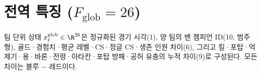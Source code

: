 
\section{전역 특징 ($F_{\mathrm{glob}} = 26$)}
\label{sec:feat-global}

팀 단위 상태 $x^{\mathrm{glob}}_\ell \in \R^{26}$은 정규화된 경기 시각(1), 양 팀의 밴 챔피언 ID(10, 범주형), 골드·경험치·평균 레벨·CS·정글 CS·생존 인원 차이(6), 그리고 킬·포탑·억제기·용·바론·전령·아타칸·포탑 방패·공허 유충의 누적 차이(9)로 구성된다. 모든 차이는 블루 $-$ 레드이다.
